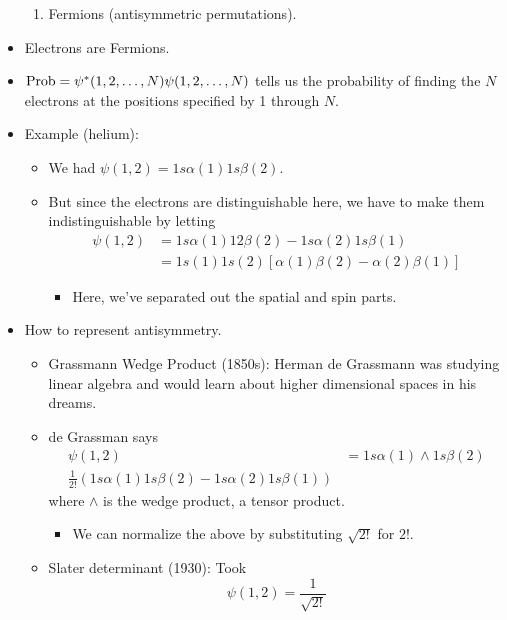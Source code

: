 \documentclass[../notes.tex]{subfiles}
\begin{document}
\begin{itemize}
\begin{enumerate}
        \item Fermions (antisymmetric permutations).
    \end{enumerate}
    \item Electrons are Fermions.
    \item $\operatorname{Prob}=\psi^*(1,2,\dots,N)\psi(1,2,\dots,N)$ tells us the probability of finding the $N$ electrons at the positions specified by 1 through $N$.
    \item Example (helium):
    \begin{itemize}
        \item We had $\psi(1,2)=1s\alpha(1)1s\beta(2)$.
        \item But since the electrons are distinguishable here, we have to make them indistinguishable by letting
        \begin{align*}
            \psi(1,2) &= 1s\alpha(1)12\beta(2)-1s\alpha(2)1s\beta(1)\\
            &= 1s(1)1s(2)[\alpha(1)\beta(2)-\alpha(2)\beta(1)]
        \end{align*}
        \begin{itemize}
            \item Here, we've separated out the spatial and spin parts.
        \end{itemize}
    \end{itemize}
    \item How to represent antisymmetry.
    \begin{itemize}
        \item Grassmann Wedge Product (1850s): Herman de Grassmann was studying linear algebra and would learn about higher dimensional spaces in his dreams.
        \item de Grassman says
        \begin{align*}
            \psi(1,2) &= 1s\alpha(1)\wedge 1s\beta(2)\\
            \frac{1}{2!}(1s\alpha(1)1s\beta(2)-1s\alpha(2)1s\beta(1))
        \end{align*}
        where $\wedge$ is the wedge product, a tensor product.
        \begin{itemize}
            \item We can normalize the above by substituting $\sqrt{2!}$ for $2!$.
        \end{itemize}
        \item Slater determinant (1930): Took
        \begin{equation*}
            \psi(1,2) = \frac{1}{\sqrt{2!}}

\end{equation*}
\end{itemize}
\end{itemize}
\end{document}
